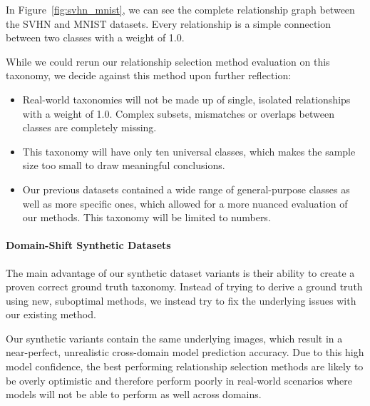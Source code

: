 In Figure~\ref{fig:svhn_mnist}, we can see the complete relationship graph between the SVHN and MNIST datasets.
Every relationship is a simple connection between two classes with a weight of 1.0.

While we could rerun our relationship selection method evaluation on this taxonomy,
we decide against this method upon further reflection:
\begin{itemize}
      \item Real-world taxonomies will not be made up of single, isolated relationships
            with a weight of 1.0. Complex subsets, mismatches or overlaps between classes are completely missing.
      \item This taxonomy will have only ten universal classes, which makes the sample size too small to draw meaningful conclusions.
      \item Our previous datasets contained a wide range of general-purpose classes as well as more specific ones, which allowed for a more nuanced evaluation of our methods.
            This taxonomy will be limited to numbers.
\end{itemize}

\paragraph{Domain-Shift Synthetic Datasets}

The main advantage of our synthetic dataset variants is their ability to create a proven correct ground truth taxonomy.
Instead of trying to derive a ground truth using new, suboptimal methods,
we instead try to fix the underlying issues with our existing method.

Our synthetic variants contain the same underlying images,
which result in a near-perfect, unrealistic cross-domain model prediction accuracy.
Due to this high model confidence, the best performing relationship selection methods are likely to be overly optimistic
and therefore perform poorly in real-world scenarios where models will not be able to perform as well across domains.


